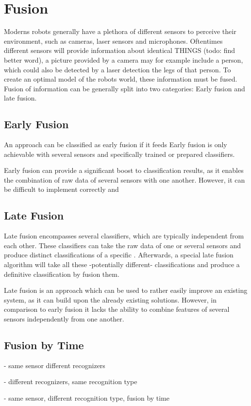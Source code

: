 
\section{Fusion}
\label{related:fusion}
Moderns robots generally have a plethora of different sensors to perceive their environment, such as cameras, laser sensors and microphones.
Oftentimes different sensors will provide information about identical THINGS (todo: find better word), a picture provided by a camera may for example include a person, which could also be detected by a laser detection the legs of that person.
To create an optimal model of the robots world, these information must be fused.
Fusion of information can be generally split into two categories: Early fusion and late fusion.

\subsection{Early Fusion}
An approach can be classified as early fusion if it feeds
Early fusion is only achievable with several sensors and specifically trained or prepared classifiers.

Early fusion can provide a significant boost to classification results, as it enables the combination of raw data of several sensors with one another.
However, it can be difficult to implement correctly and 

\subsection{Late Fusion}
Late fusion encompasses several classifiers, which are typically independent from each other. 
These classifiers can take the raw data of one or several sensors and produce distinct classifications of a specific .
Afterwards, a special late fusion algorithm will take all these -potentially different- classifications and produce a definitive classification by fusion them.

Late fusion is an approach which can be used to rather easily improve an existing system, as it can build upon the already existing solutions.
However, in comparison to early fusion it lacks the ability to combine features of several sensors independently from one another.


\subsection{Fusion by Time}


- same sensor different recognizers 

- different recognizers, same recognition type

- same sensor, different recognition type, fusion by time